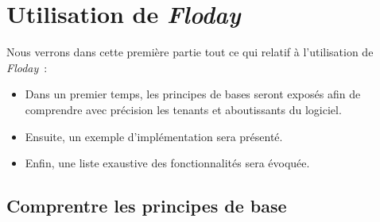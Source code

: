 \section{Utilisation de \emph{Floday}}

\begin{intro}
	Nous verrons dans cette première partie tout ce qui relatif à l'utilisation de \emph{Floday}~:
	\begin{itemize}
		\item Dans un premier temps, les principes de bases seront exposés afin de comprendre avec précision les tenants et aboutissants du logiciel.
		\item Ensuite, un exemple d'implémentation sera présenté.
		\item Enfin, une liste exaustive des fonctionnalités sera évoquée.
	\end{itemize}
\end{intro}

\subsection{Comprentre les principes de base}







